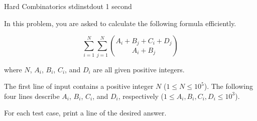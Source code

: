 \begin{problem}{Hard Combinatorics}
{stdin}{stdout}
{1 second}{}{}

In this problem, you are asked to calculate the following formula efficiently.

\begin{equation}
    \sum_{i = 1}^{N} \sum_{j = 1}^{N} { {A_i + B_j + C_i + D_j} \choose {A_i + B_j} }
\end{equation}

where $N$, $A_i$, $B_i$, $C_i$, and $D_i$ are all given positive integers.


\InputFile

The first line of input contains a positive integer $N$ ($1 \le N \le 10^5$).
The following four lines describe $A_i$, $B_i$, $C_i$, and $D_i$, respectively ($1 \le A_i, B_i, C_i, D_i \le 10^3$).

\OutputFile

For each test case, print a line of the desired answer. 

\Examples

\begin{example}
%
\end{example}

\end{problem}
